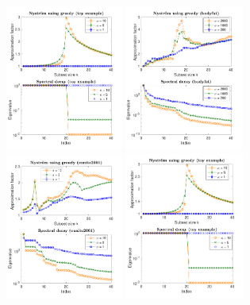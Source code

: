 \documentclass{article}
\begin{document}
 \begin{figure}[t]
  \centering
  \ifisarxiv
    \includegraphics[width=0.345\textwidth]{figs/nystrom/rbf-toy-greedy}
   \hspace{-6mm}
  \includegraphics[width=0.345\textwidth]{figs/nystrom/rbf-bodyfat-greedy}
  \hspace{-6mm}
  \includegraphics[width=0.345\textwidth]{figs/nystrom/rbf-eunite2001-greedy}
  \else
  \includegraphics[width=0.35\textwidth]{figs/nystrom/rbf-toy-greedy}

\end{figure}
\end{document}

